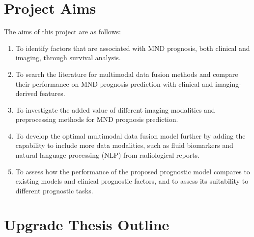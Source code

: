
\section{Project Aims}

The aims of this project are as follows:

\begin{enumerate}[label=Aim \arabic*:]
    \item To identify factors that are associated with MND prognosis, both clinical and imaging, through survival analysis.
    \item To search the literature for multimodal data fusion methods and compare their performance on MND prognosis prediction with clinical and imaging-derived features.
    \item To investigate the added value of different imaging modalities and preprocessing methods for MND prognosis prediction.
    \item To develop the optimal multimodal data fusion model further by adding the capability to include more data modalities, such as fluid biomarkers and natural language processing (NLP) from radiological reports.
    \item To assess how the performance of the proposed prognostic model compares to existing models and clinical prognostic factors, and to assess its suitability to different prognostic tasks.
\end{enumerate}


\section{Upgrade Thesis Outline}

